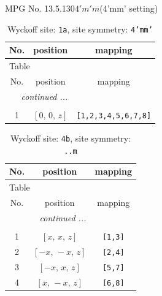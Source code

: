 \documentclass[fleqn,8pt]{jsarticle}
\begin{document}
\setcounter{MaxMatrixCols}{32}

\renewcommand{\tablename}{Table~}
\renewcommand{\figurename}{Figure~}
\begin{center}
\LARGE
MPG No. 13.5.130\quad$4'm'm$\quad(4'mm' setting)
\end{center}
\renewcommand{\arraystretch}{1.2}
\begin{longtable}{ccc}
\caption{Wyckoff site: {\tt 1a}, site symmetry: {\tt 4'mm'}}
 \\
 \hline \hline
No. & position & mapping \\ \hline \endfirsthead

\multicolumn{2}{l}{\tablename\ \thetable{}} \\
 \hline \hline
No. & position & mapping \\ \hline \endhead

 \hline \hline
\multicolumn{2}{r}{\footnotesize\it continued ...} \\ \endfoot

 \hline \hline
\multicolumn{2}{r}{} \\ \endlastfoot

1 & $\left[ 0,\, 0,\, z \right]$ & {\tt [1,2,3,4,5,6,7,8]} \\
\end{longtable}
\renewcommand{\arraystretch}{1.2}
\begin{longtable}{ccc}
\caption{Wyckoff site: {\tt 4b}, site symmetry: {\tt ..m}}
 \\
 \hline \hline
No. & position & mapping \\ \hline \endfirsthead

\multicolumn{2}{l}{\tablename\ \thetable{}} \\
 \hline \hline
No. & position & mapping \\ \hline \endhead

 \hline \hline
\multicolumn{2}{r}{\footnotesize\it continued ...} \\ \endfoot

 \hline \hline
\multicolumn{2}{r}{} \\ \endlastfoot

1 & $\left[ x,\, x,\, z \right]$ & {\tt [1,3]} \\ \hline
2 & $\left[ - x,\, - x,\, z \right]$ & {\tt [2,4]} \\ \hline
3 & $\left[ - x,\, x,\, z \right]$ & {\tt [5,7]} \\ \hline
4 & $\left[ x,\, - x,\, z \right]$ & {\tt [6,8]} \\
\end{longtable}
\end{document}
